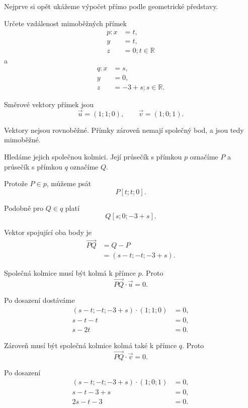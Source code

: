 Nejprve si opět ukážeme výpočet přímo podle geometrické představy.

\begin{example}
    \label{exa:Distance_skew_lines_geometrically}

    Určete vzdálenost mimoběžných přímek
    \[
        \begin{aligned}
            p: x&=t,\\
            y&=t,\\
            z&=0; t\in\mathbb{R}
        \end{aligned}
    \]
    a
    \[
        \begin{aligned}
            q: x&=s,\\
            y&=0,\\
            z&=-3+s; s\in\mathbb{R}.
        \end{aligned}
    \]

    Směrové vektory přímek jsou
    \[
        \vec{u}=(1;1;0),
        \qquad
        \vec{v}=(1;0;1).
    \]

    Vektory nejsou rovnoběžné. Přímky zároveň nemají společný bod,
    a jsou tedy mimoběžné.

    Hledáme jejich společnou kolmici. Její průsečík s přímkou $p$
    označíme $P$ a průsečík s přímkou $q$ označíme $Q$.

    Protože $P\in p$, můžeme psát
    \[
        P[t;t;0].
    \]

    Podobně pro $Q\in q$ platí
    \[
        Q[s;0;-3+s].
    \]

    Vektor spojující oba body je
    \begin{align*}
        \overrightarrow{PQ}
        &=
        Q-P\\
        &=
        (s-t;-t;-3+s).
    \end{align*}

    Společná kolmice musí být kolmá k přímce $p$. Proto
    \[
        \overrightarrow{PQ}\cdot\vec{u}=0.
    \]

    Po dosazení dostáváme
    \begin{align*}
        (s-t;-t;-3+s)\cdot(1;1;0)&=0,\\
        s-t-t&=0,\\
        s-2t&=0.
    \end{align*}

    Zároveň musí být společná kolmice kolmá také k přímce $q$.
    Proto
    \[
        \overrightarrow{PQ}\cdot\vec{v}=0.
    \]

    Po dosazení
    \begin{align*}
        (s-t;-t;-3+s)\cdot(1;0;1)&=0,\\
        s-t-3+s&=0,\\
        2s-t-3&=0.
    \end{align*}


\end{example}
